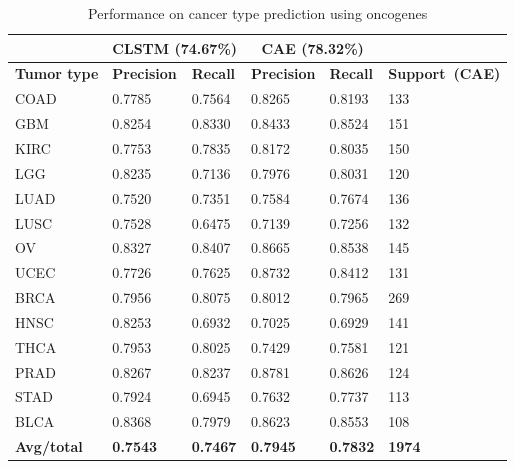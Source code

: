 \begin{table}[h]
\caption{Performance on cancer type prediction using oncogenes }
\label{table:resultoncogene} 
\begin{center}
    \scriptsize
    \vspace{-5mm}
    \begin{tabular}{l|ll|ll|l}
        \hline
        \rowcolor{Gray}
        {} & \multicolumn{2}{c}{\textbf{CLSTM (74.67\%)}} & \multicolumn{2}{c}{\textbf{CAE (78.32\%)}} &  {} \\\hline
        \textbf{Tumor type }& \textbf{Precision} &  \textbf{Recall}  & \textbf{Precision} &  \textbf{Recall} & \textbf{Support~(CAE)} \\\hline
        COAD   & 0.7785 & 0.7564 & 0.8265 & 0.8193 & 133  \\\hline
        GBM    & 0.8254 & 0.8330 & 0.8433 & 0.8524 & 151  \\\hline
        KIRC   & 0.7753 & 0.7835 & 0.8172 & 0.8035 & 150  \\\hline
        LGG    & 0.8235 & 0.7136 & 0.7976 & 0.8031 & 120  \\\hline
        LUAD   & 0.7520 & 0.7351 & 0.7584 & 0.7674 & 136  \\\hline
        LUSC   & 0.7528 & 0.6475 & 0.7139 & 0.7256 & 132  \\\hline
        OV     & 0.8327 & 0.8407 & 0.8665 & 0.8538 & 145  \\\hline
        UCEC   & 0.7726 & 0.7625 & 0.8732 & 0.8412 & 131  \\\hline
        BRCA   & 0.7956 & 0.8075 & 0.8012 & 0.7965 & 269  \\\hline
        HNSC   & 0.8253 & 0.6932 & 0.7025 & 0.6929 & 141  \\\hline
        THCA   & 0.7953 & 0.8025 & 0.7429 & 0.7581 & 121  \\\hline
        PRAD   & 0.8267 & 0.8237 & 0.8781 & 0.8626 & 124  \\\hline
        STAD   & 0.7924 & 0.6945 & 0.7632 & 0.7737 & 113  \\\hline
        BLCA   & 0.8368 & 0.7979 & 0.8623 & 0.8553 & 108  \\\hline
        \rowcolor{LightCyan}
        \textbf{Avg/total} &   \textbf{0.7543}    &  \textbf{0.7467} &    \textbf{0.7945}   &  \textbf{0.7832} & \textbf{1974} \\\hline
    \end{tabular}
     \vspace{-6mm}
    \end{center}
\end{table}

